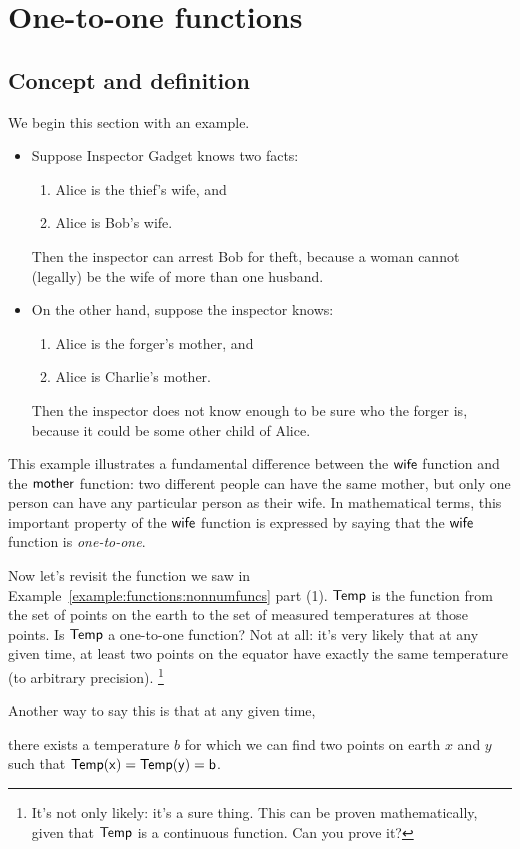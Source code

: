 \section{One-to-one functions}

\subsection{Concept and definition}

\medskip\noindent
We begin this section with an example.

\begin{example}{} 
\begin{itemize}
\item Suppose Inspector Gadget knows two facts:
\begin{enumerate}
\item Alice is the thief's wife,
and
\item Alice is Bob's wife.
\end{enumerate}
Then the inspector can arrest Bob for theft,
because a woman cannot (legally) be the wife of more than one husband.

\item On the other hand, suppose the inspector knows:
\begin{enumerate}
\item Alice is the forger's mother,
and
\item Alice is Charlie's mother.
\end{enumerate}
Then the inspector does not know enough to be sure who the forger is,
because it could be some other child of Alice.
\end{itemize}
This example illustrates a fundamental difference between the $\sf{wife}$ function and the $\sf{mother}$ function: two different people can have the same mother, but only one person can have any particular person as their wife. 
In mathematical terms, this important property of the $\sf{wife}$ function is expressed by saying that the $\sf{wife}$ function is  \emph{one-to-one}.
\end{example}

\begin{example}{}
Now let's revisit the function we saw in Example~\ref{example:functions:nonnumfuncs} part (1).  $\sf{Temp}$ is the function from the set of points on the earth to the set of measured temperatures at those points.  Is $\sf{Temp}$ a one-to-one function?  Not at all: it's very likely that at any given time, at least two points on the equator have exactly the same temperature (to arbitrary precision).  
\footnote{It's not only likely: it's a sure thing. This can be proven mathematically, given that $\sf{Temp}$ is a continuous function.  Can you prove it?}

Another way to say this is that at any given time, 

\begin{center}
there exists a temperature $b$ for which we can find two points on earth $x$ and $y$ such that  $\sf{Temp}(x) = \sf{Temp}(y) = b$.
\end{center}
\end{example}

